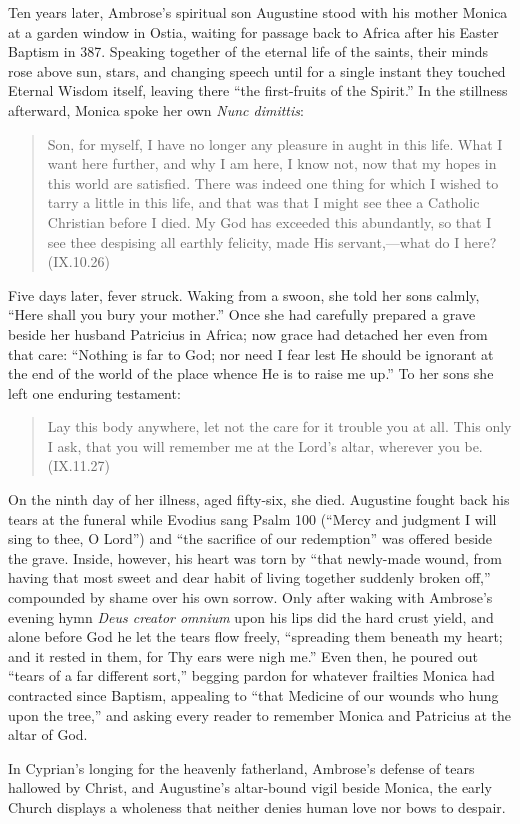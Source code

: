 Ten years later, Ambrose's spiritual son Augustine stood with his mother Monica at a garden window in Ostia, waiting for passage back to Africa after his Easter Baptism in 387. Speaking together of the eternal life of the saints, their minds rose above sun, stars, and changing speech until for a single instant they touched Eternal Wisdom itself, leaving there ``the first-fruits of the Spirit.'' In the stillness afterward, Monica spoke her own \emph{Nunc dimittis}:

\begin{quote}
Son, for myself, I have no longer any pleasure in aught in this life. What I want here further, and why I am here, I know not, now that my hopes in this world are satisfied. There was indeed one thing for which I wished to tarry a little in this life, and that was that I might see thee a Catholic Christian before I died. My God has exceeded this abundantly, so that I see thee despising all earthly felicity, made His servant,---what do I here? (IX.10.26)
\end{quote}

Five days later, fever struck. Waking from a swoon, she told her sons calmly, ``Here shall you bury your mother.'' Once she had carefully prepared a grave beside her husband Patricius in Africa; now grace had detached her even from that care: ``Nothing is far to God; nor need I fear lest He should be ignorant at the end of the world of the place whence He is to raise me up.'' To her sons she left one enduring testament:

\begin{quote}
Lay this body anywhere, let not the care for it trouble you at all. This only I ask, that you will remember me at the Lord's altar, wherever you be. (IX.11.27)
\end{quote}

On the ninth day of her illness, aged fifty-six, she died. Augustine fought back his tears at the funeral while Evodius sang Psalm 100 (``Mercy and judgment I will sing to thee, O Lord'') and ``the sacrifice of our redemption'' was offered beside the grave. Inside, however, his heart was torn by ``that newly-made wound, from having that most sweet and dear habit of living together suddenly broken off,'' compounded by shame over his own sorrow. Only after waking with Ambrose's evening hymn \emph{Deus creator omnium} upon his lips did the hard crust yield, and alone before God he let the tears flow freely, ``spreading them beneath my heart; and it rested in them, for Thy ears were nigh me.'' Even then, he poured out ``tears of a far different sort,'' begging pardon for whatever frailties Monica had contracted since Baptism, appealing to ``that Medicine of our wounds who hung upon the tree,'' and asking every reader to remember Monica and Patricius at the altar of God.

In Cyprian's longing for the heavenly fatherland, Ambrose's defense of tears hallowed by Christ, and Augustine's altar-bound vigil beside Monica, the early Church displays a wholeness that neither denies human love nor bows to despair.
